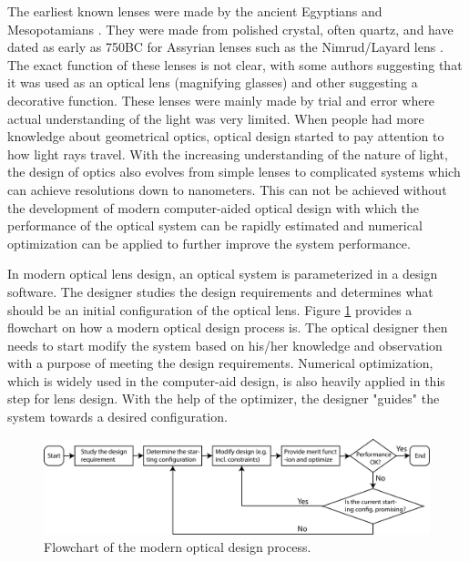 The earliest known lenses were made by the ancient Egyptians and Mesopotamians \cite{wiki:HistoryofOptics}. They were made from polished crystal, often quartz, and have dated as early as 750BC for Assyrian lenses such as the Nimrud/Layard lens \cite{wiki:Nimrudlens}. The exact function of these lenses is not clear, with some authors suggesting that it was used as an optical lens (magnifying glasses) and other suggesting a decorative function. These lenses were mainly made by trial and error where actual understanding of the light was very limited. When people had more knowledge about geometrical optics, optical design started to pay attention to how light rays travel. With the increasing understanding of the nature of light, the design of optics also evolves from simple lenses to complicated systems which can achieve resolutions down to nanometers. This can not be achieved without the development of modern computer-aided optical design with which the performance of the optical system can be rapidly estimated and numerical optimization can be applied to further improve the system performance.

In modern optical lens design, an optical system is parameterized in a design software. The designer studies the design requirements and determines what should be an initial configuration of the optical lens. Figure \ref{fig:chap0 model design flow} provides a flowchart on how a modern optical design process is. The optical designer then needs to start modify the system based on his/her knowledge and observation with a purpose of meeting the design requirements. Numerical optimization, which is widely used in the computer-aid design, is also heavily applied in this step for lens design. With the help of the optimizer, the designer "guides" the system towards a desired configuration. 

\begin{figure}
    \centering
    \includegraphics[scale=0.58]{chapter-0/figures/lens_design_flow_chart.png}
    \caption{Flowchart of the modern optical design process.}
    \label{fig:chap0 model design flow}
\end{figure} 

